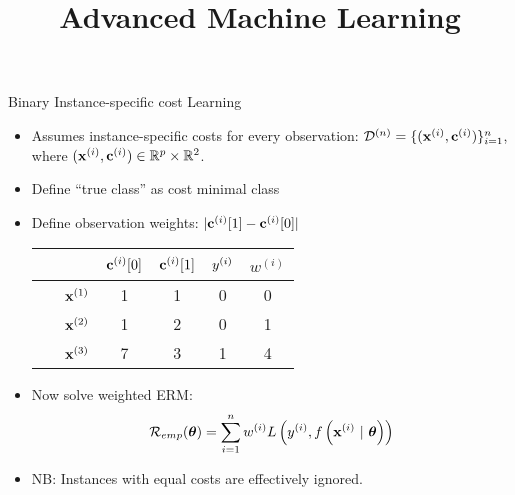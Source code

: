 \documentclass[11pt,compress,t,notes=noshow, xcolor=table]{beamer}
\title{Advanced Machine Learning}
\date{}
\begin{document}



\sloppy





\begin{vbframe}{Binary Instance-specific cost Learning}
    \begin{itemize}
        \item Assumes instance-specific costs for every observation:  $\mathcal{D}^{(n)} = \{(\mathbf{x}^{(i)}, \mathbf{c}^{(i)})\}_{i=1}^n$, where $(\mathbf{x}^{(i)}, \mathbf{c}^{(i)}) \in \mathbb{R}^p \times \mathbb{R}^2$.
        \vspace{5pt}

        \item Define ``true class'' as cost minimal class
        \vspace{5pt}
        
        \item Define observation weights: $|\mathbf{c}^{(i)}[1] - \mathbf{c}^{(i)}[0]|$
        \vspace{5pt}

        \begin{center}
                            \begin{tabular}{cc|cccc}\
        			& & $\mathbf{c}^{(i)}[0]$ & $\mathbf{c}^{(i)}[1]$ & $y^{(i)}$ & $w^{(i)}$ \\
        			\hline & $\mathbf{x}^{(1)}$ & 1 & 1 & 0 & 0\\
        			& $\mathbf{x}^{(2)}$ & 1 & 2 & 0 & 1\\
        			& $\mathbf{x}^{(3)}$ & 7 & 3 & 1 & 4\\

                \end{tabular}
        \end{center}
                \vspace{5pt}

        \item Now solve weighted ERM:
        \begin{equation*}
            \mathcal{R}_{emp}(\boldsymbol{\theta}) = \sum_{i=1}^{n}w^{(i)} L\left(y^{(i)}, f\left(\mathbf{x}^{(i)} ~|~ \bm{\theta}\right)\right)
        \end{equation*}
        
        \item NB: Instances with equal costs are effectively ignored.
        \end{itemize}
            
\end{vbframe}
\end{document}
